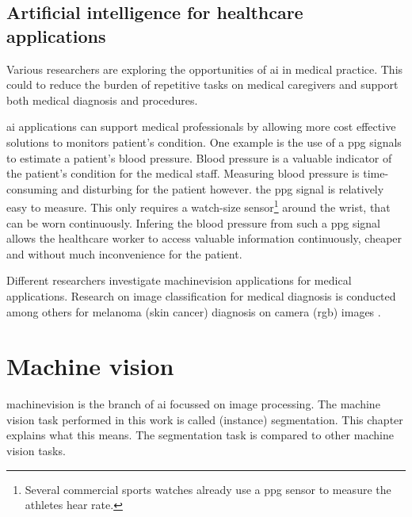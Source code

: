 \subsection{Artificial intelligence for healthcare applications}

\par{
    Various researchers are exploring the opportunities of \Gls{ai} in medical practice.
    This could to reduce the burden of repetitive tasks on medical caregivers and support both medical diagnosis and procedures.
}
\par{
    \Gls{ai} applications can support medical professionals by allowing more cost effective solutions to monitors patient's condition.
    One example is the use of a \acrfull{ppg} signals to estimate a patient's blood pressure.
    Blood pressure is a valuable indicator of the patient's condition for the medical staff.
    Measuring blood pressure is time-consuming and disturbing for the patient however. 
    the \acrshort{ppg} signal is relatively easy to measure. This only requires a watch-size sensor\footnote{Several commercial sports watches already use a \acrshort{ppg} sensor to measure the athletes hear rate.} 
    around the wrist, that can be worn continuously.
    Infering the blood pressure from such a \acrshort{ppg} signal\cite{Khalid2018} allows the healthcare worker to access valuable information continuously, cheaper and without much inconvenience for the patient.
}
\par{
    Different researchers investigate \Gls{machinevision} applications for medical applications. 
    Research on image classification for medical diagnosis is conducted among others for melanoma (skin cancer) diagnosis on camera (\acrshort{rgb}) images \cite{Vocaturo2019}.
}
\section{Machine vision}
\par{
    \Gls{machinevision} is the branch of \Gls{ai} focussed on image processing.
    The machine vision task performed in this work is called (instance) \Gls{segmentation}.
    This chapter explains what this means. 
    The segmentation task is compared to other machine vision tasks.
}

